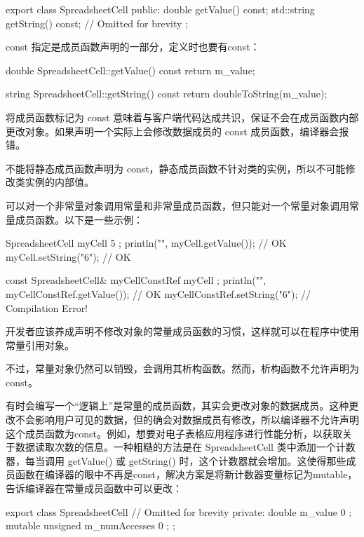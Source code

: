 \begin{cpp}
export class SpreadsheetCell
{
    public:
        double getValue() const;
        std::string getString() const;
        // Omitted for brevity
};
\end{cpp}

const 指定是成员函数声明的一部分，定义时也要有const：

\begin{cpp}
double SpreadsheetCell::getValue() const
{
    return m_value;
}

string SpreadsheetCell::getString() const
{
    return doubleToString(m_value);
}
\end{cpp}

将成员函数标记为 const 意味着与客户端代码达成共识，保证不会在成员函数内部更改对象。如果声明一个实际上会修改数据成员的 const 成员函数，编译器会报错。

不能将静态成员函数声明为 const，静态成员函数不针对类的实例，所以不可能修改类实例的内部值。

可以对一个非常量对象调用常量和非常量成员函数，但只能对一个常量对象调用常量成员函数。以下是一些示例：

\begin{cpp}
SpreadsheetCell myCell { 5 };
println("{}", myCell.getValue()); // OK
myCell.setString("6"); // OK

const SpreadsheetCell& myCellConstRef { myCell };
println("{}", myCellConstRef.getValue()); // OK
myCellConstRef.setString("6"); // Compilation Error!
\end{cpp}

开发者应该养成声明不修改对象的常量成员函数的习惯，这样就可以在程序中使用常量引用对象。

不过，常量对象仍然可以销毁，会调用其析构函数。然而，析构函数不允许声明为 const。


有时会编写一个“逻辑上”是常量的成员函数，其实会更改对象的数据成员。这种更改不会影响用户可见的数据，但的确会对数据成员有修改，所以编译器不允许声明这个成员函数为const。例如，想要对电子表格应用程序进行性能分析，以获取关于数据读取次数的信息。一种粗糙的方法是在 SpreadsheetCell 类中添加一个计数器，每当调用 getValue() 或 getString() 时，这个计数器就会增加。这使得那些成员函数在编译器的眼中不再是const，解决方案是将新计数器变量标记为mutable，告诉编译器在常量成员函数中可以更改：

\begin{cpp}
export class SpreadsheetCell
{
    // Omitted for brevity
    private:
        double m_value { 0 };
        mutable unsigned m_numAccesses { 0 };
};
\end{cpp}


